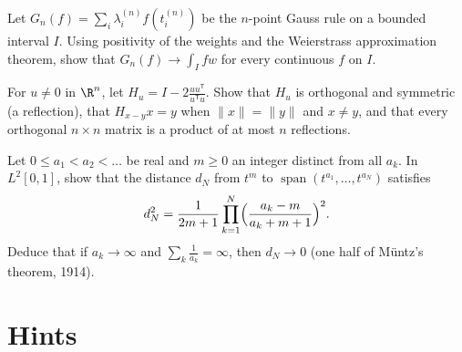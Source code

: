 \begin{exercise}[$\star\star$]\label{ex:gaussconv}
Let $G_n(f)=\sum_i\lambda_i^{(n)}f(t_i^{(n)})$ be the $n$-point Gauss rule on a bounded interval $I$. Using positivity of the
weights and the Weierstrass approximation theorem, show that $G_n(f)\to\int_Ifw$ for every continuous $f$ on $I$.
\end{exercise}

\begin{exercise}[$\star\star$]\label{ex:householder}
For $u\ne0$ in $\R^n$, let $H_u=I-2\frac{uu^{\mathsf T}}{u^{\mathsf T}u}$. Show that $H_u$ is orthogonal and symmetric (a
reflection), that $H_{x-y}x=y$ when $\|x\|=\|y\|$ and $x\ne y$, and that every orthogonal $n\times n$ matrix is a product of
at most $n$ reflections.
\end{exercise}

\begin{exercise}[$\star\star\star$]\label{ex:muntz}
Let $0\le a_1<a_2<\dots$ be real and $m\ge0$ an integer distinct from all $a_k$. In $L^2[0,1]$, show that the distance
$d_N$ from $t^m$ to $\operatorname{span}(t^{a_1},\dots,t^{a_N})$ satisfies
\[
d_N^2=\frac1{2m+1}\prod_{k=1}^N\Bigl(\frac{a_k-m}{a_k+m+1}\Bigr)^2.
\]
Deduce that if $a_k\to\infty$ and $\sum_k\frac1{a_k}=\infty$, then $d_N\to0$ (one half of M\"untz's theorem, 1914).
\end{exercise}

\section{Hints}

